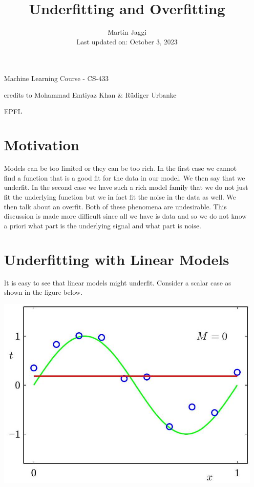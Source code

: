 \documentclass[10pt]{article}
\title{Underfitting and Overfitting }
\author{Martin Jaggi\\
Last updated on: October 3, 2023}
\date{}
\begin{document}
\maketitle
Machine Learning Course - CS-433

credits to Mohammad Emtiyaz Khan \& Rüdiger Urbanke

EPFL

\section*{Motivation}
Models can be too limited or they can be too rich. In the first case we cannot find a function that is a good fit for the data in our model. We then say that we underfit. In the second case we have such a rich model family that we do not just fit the underlying function but we in fact fit the noise in the data as well. We then talk about an overfit. Both of these phenomena are undesirable. This discussion is made more difficult since all we have is data and so we do not know a priori what part is the underlying signal and what part is noise.

\section*{Underfitting with Linear Models}
It is easy to see that linear models might underfit. Consider a scalar case as shown in the figure below.

\begin{center}
\includegraphics[max width=\textwidth]{2023_12_30_cfff7db3d8d5672f46efg-2}
\end{center}
\end{document}
